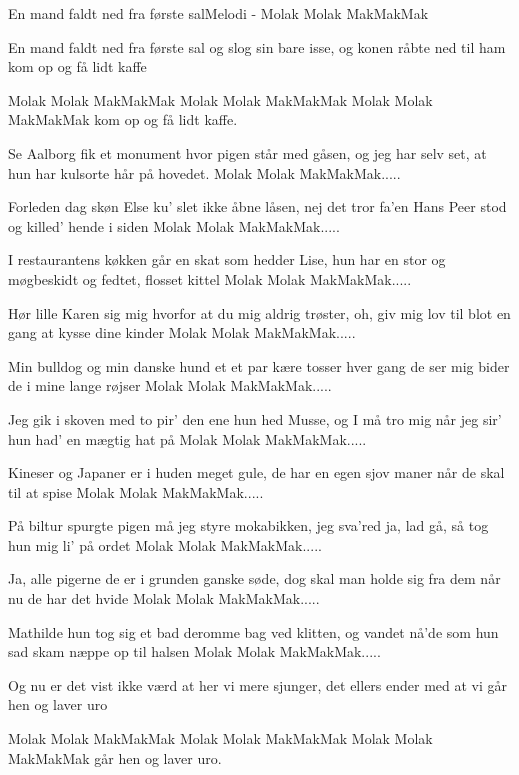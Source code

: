\begin{sang}{En mand faldt ned fra første sal}{Melodi - Molak Molak MakMakMak}
\begin{vers}
En mand faldt ned fra første sal
og slog sin bare isse,
og konen råbte ned til ham
kom op og få lidt kaffe
\end{vers}
\begin{omkvaed}
Molak Molak MakMakMak 
Molak Molak MakMakMak 
Molak Molak MakMakMak 
kom op og få lidt kaffe.
\end{omkvaed}
\begin{vers}
Se Aalborg fik et monument
hvor pigen står med gåsen,
og jeg har selv set, at hun har
kulsorte hår på hovedet.
Molak Molak MakMakMak.....
\end{vers}
\begin{vers}
Forleden dag skøn Else ku'
slet ikke åbne låsen,
nej det tror fa'en Hans Peer stod
og killed' hende i siden
Molak Molak MakMakMak.....
\end{vers}
\begin{vers}
I restaurantens køkken går
en skat som hedder Lise,
hun har en stor og møgbeskidt
og fedtet, flosset kittel
Molak Molak MakMakMak.....
\end{vers}
\begin{vers}
Hør lille Karen sig mig hvorfor
at du mig aldrig trøster,
oh, giv mig lov til blot en gang
at kysse dine kinder
Molak Molak MakMakMak.....
\end{vers}
\begin{vers}
Min bulldog og min danske hund
et et par kære tosser
hver gang de ser mig bider de
i mine lange røjser
Molak Molak MakMakMak.....
\end{vers}
\begin{vers}
Jeg gik i skoven med to pir'
den ene hun hed Musse,
og I må tro mig når jeg sir'
hun had' en mægtig hat på
Molak Molak MakMakMak.....
\end{vers}
\begin{vers}
Kineser og Japaner er
i huden meget gule,
de har en egen sjov maner
når de skal til at spise
Molak Molak MakMakMak.....
\end{vers}
\begin{vers} 
På biltur spurgte pigen må
jeg styre mokabikken,
jeg sva'red ja, lad gå, så
tog hun mig li' på ordet
Molak Molak MakMakMak.....
\end{vers}
\begin{vers} 
Ja, alle pigerne de er
i grunden ganske søde,
dog skal man holde sig fra dem
når nu de har det hvide
Molak Molak MakMakMak.....
\end{vers}
\begin{vers}
Mathilde hun tog sig et bad
deromme bag ved klitten,
og vandet nå'de som hun sad
skam næppe op til halsen
Molak Molak MakMakMak.....
\end{vers}
\begin{vers}
Og nu er det vist ikke værd
at her vi mere sjunger,
det ellers ender med at vi
går hen og laver uro
\end{vers}
\begin{omkvaed}
Molak Molak MakMakMak
Molak Molak MakMakMak
Molak Molak MakMakMak
går hen og laver uro.
\end{omkvaed}
\laps
\end{sang}